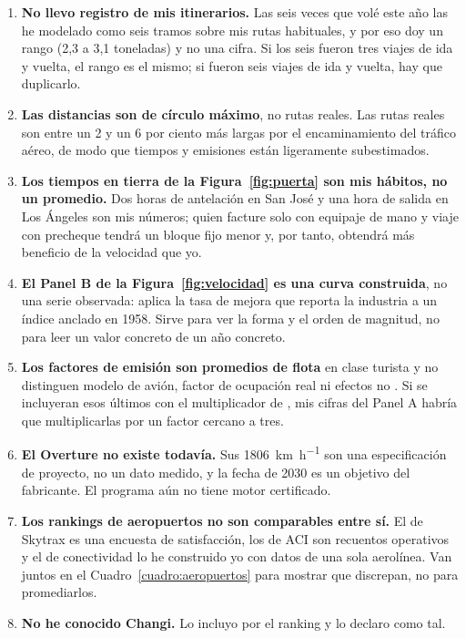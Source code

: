 \documentclass[11pt,letterpaper]{article}
\begin{document}
\begin{enumerate}
\item \textbf{No llevo registro de mis itinerarios.} Las seis veces que volé
  este año las he modelado como seis tramos sobre mis rutas habituales, y por
  eso doy un rango (2,3 a 3,1 toneladas) y no una cifra. Si los seis fueron
  tres viajes de ida y vuelta, el rango es el mismo; si fueron seis viajes de
  ida y vuelta, hay que duplicarlo.
\item \textbf{Las distancias son de círculo máximo}, no rutas reales. Las rutas
  reales son entre un 2 y un 6 por ciento más largas por el encaminamiento del
  tráfico aéreo, de modo que tiempos y emisiones están ligeramente
  subestimados.
\item \textbf{Los tiempos en tierra de la Figura~\ref{fig:puerta} son mis
  hábitos, no un promedio.} Dos horas de antelación en San José y una hora de
  salida en Los Ángeles son mis números; quien facture solo con equipaje de
  mano y viaje con precheque tendrá un bloque fijo menor y, por tanto, obtendrá
  más beneficio de la velocidad que yo.
\item \textbf{El Panel B de la Figura~\ref{fig:velocidad} es una curva
  construida}, no una serie observada: aplica la tasa de mejora que reporta la
  industria a un índice anclado en 1958. Sirve para ver la forma y el orden de
  magnitud, no para leer un valor concreto de un año concreto.
\item \textbf{Los factores de emisión son promedios de flota} en clase turista
  y no distinguen modelo de avión, factor de ocupación real ni efectos no
  . Si se incluyeran esos últimos con el multiplicador de
  \textcite{lee2021}, mis cifras del Panel A habría que multiplicarlas por un
  factor cercano a tres.
\item \textbf{El Overture no existe todavía.} Sus \SI{1806}{\kilo\meter\per\hour}
  son una especificación de proyecto, no un dato medido, y la fecha de 2030 es
  un objetivo del fabricante. El programa aún no tiene motor certificado.
\item \textbf{Los rankings de aeropuertos no son comparables entre sí.} El de
  Skytrax es una encuesta de satisfacción, los de ACI son recuentos
  operativos y el de conectividad lo he construido yo con datos de una sola
  aerolínea. Van juntos en el Cuadro~\ref{cuadro:aeropuertos} para mostrar que
  discrepan, no para promediarlos.
\item \textbf{No he conocido Changi.} Lo incluyo por el ranking y lo declaro
  como tal.
\end{enumerate}

\printbibliography
\end{document}
